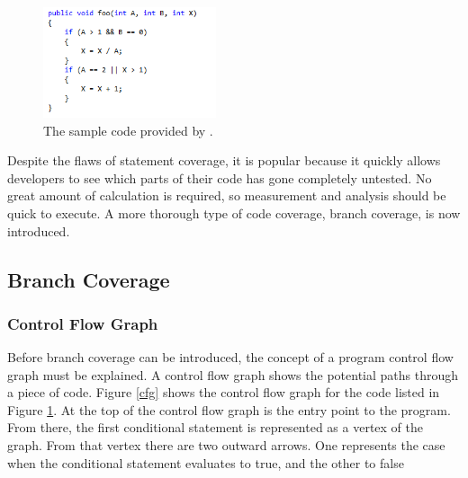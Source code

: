 \begin{figure}[h]
	\begin{center}
		\includegraphics[width=2in]{figures/code_coverage.png}
	\end{center}
\caption{The sample code provided by \citet{Myers:2004:AST:983238}.}
\label{codeCoverage}
\end{figure}

Despite the flaws of statement coverage, it is popular because it quickly allows developers to see which parts of their code has gone completely untested. No great amount of calculation is required, so measurement and analysis should be quick to execute. A more thorough type of code coverage, branch coverage, is now introduced.

\subsection{Branch Coverage}

\subsubsection{Control Flow Graph}

Before branch coverage can be introduced, the concept of a program control flow graph must be explained. A control flow graph shows the potential paths through a piece of code. Figure \ref{cfg} shows the control flow graph for the code listed in Figure \ref{codeCoverage}. At the top of the control flow graph is the entry point to the program. From there, the first conditional statement is represented as a vertex of the graph. From that vertex there are two outward arrows. One represents the case when the conditional statement evaluates to true, and the other to false \citep{Myers:2004:AST:983238}

